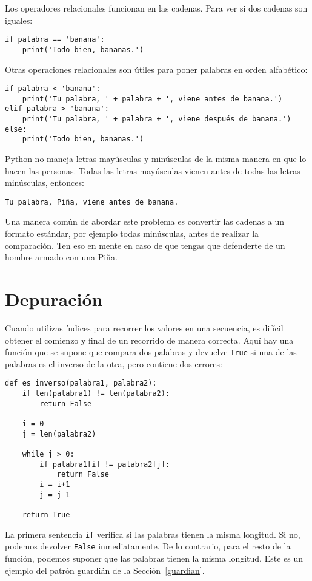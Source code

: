 \documentclass[10pt]{book}
\begin{document}
Los operadores relacionales funcionan en las cadenas.  Para ver si dos cadenas son iguales:

\begin{verbatim}
if palabra == 'banana':
    print('Todo bien, bananas.')
\end{verbatim}
%
Otras operaciones relacionales son útiles para poner palabras en orden
alfabético:

\begin{verbatim}
if palabra < 'banana':
    print('Tu palabra, ' + palabra + ', viene antes de banana.')
elif palabra > 'banana':
    print('Tu palabra, ' + palabra + ', viene después de banana.')
else:
    print('Todo bien, bananas.')
\end{verbatim}
%
Python no maneja letras mayúsculas y minúsculas de la misma manera en que
lo hacen las personas.  Todas las letras mayúsculas vienen antes de todas las
letras minúsculas, entonces:

\begin{verbatim}
Tu palabra, Piña, viene antes de banana.
\end{verbatim}
%
Una manera común de abordar este problema es convertir las cadenas a un
formato estándar, por ejemplo todas minúsculas, antes de realizar
la comparación.  Ten eso en mente en caso de que tengas que defenderte
de un hombre armado con una Piña.


\section{Depuración}

Cuando utilizas índices para recorrer los valores en una secuencia,
es difícil obtener el comienzo y final de un recorrido
de manera correcta.  Aquí hay una función que se supone que compara dos
palabras y devuelve {\tt True} si una de las palabras es el inverso
de la otra, pero contiene dos errores:

\begin{verbatim}
def es_inverso(palabra1, palabra2):
    if len(palabra1) != len(palabra2):
        return False

    i = 0
    j = len(palabra2)

    while j > 0:
        if palabra1[i] != palabra2[j]:
            return False
        i = i+1
        j = j-1

    return True
\end{verbatim}
%
La primera sentencia {\tt if} verifica si las palabras tienen la
misma longitud.  Si no, podemos devolver {\tt False} inmediatamente.
De lo contrario, para el resto de la función, podemos suponer que las palabras
tienen la misma longitud.  Este es un ejemplo del patrón guardián
de la Sección~\ref{guardian}.
\end{document}
